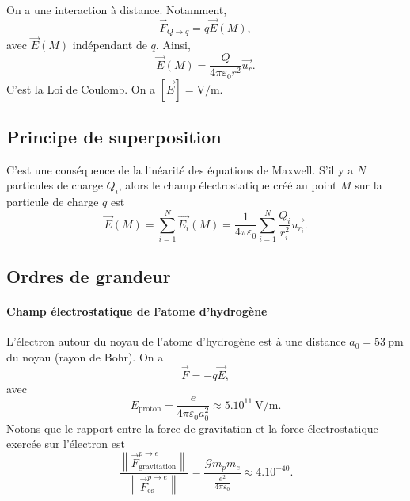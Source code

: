             On a une interaction à distance. Notamment,
            \begin{equation}
                \vec{F}_{Q\to q}=q\vec{E}(M),
            \end{equation}
            avec $\vec{E}(M)$ indépendant de $q$. Ainsi,
            \begin{equation}
                \boxed{
                    \vec{E}(M)=\frac{Q}{4\pi\varepsilon_{0}r^{2}}\vec{u_r}.
                }
            \end{equation}
            C'est la Loi de Coulomb. On a $[\vec{E}]=\si{\volt\per\metre}$.

    \subsection{Principe de superposition}

        C'est une conséquence de la linéarité des équations de Maxwell. S'il y a $N$ particules de charge $Q_i$, alors le champ électrostatique créé au point $M$ sur la particule de charge $q$ est 
        \begin{equation}
            \boxed{
                \vec{E}(M)=\sum_{i=1}^{N}\vec{E_i}(M)=\frac{1}{4\pi\varepsilon_{0}}\sum_{i=1}^{N}\frac{Q_i}{r_i^{2}}\vec{u_{r_i}}.
            }
        \end{equation}

    \subsection{Ordres de grandeur}

        \paragraph{Champ électrostatique de l'atome d'hydrogène}

            L'électron autour du noyau de l'atome d'hydrogène est à une distance $a_0=53~\si{\pico\metre}$ du noyau (rayon de Bohr). On a 
            \begin{equation}
                \vec{F}=-q\vec{E},
            \end{equation}
            avec
            \begin{equation}
                E_{\text{proton}}=\frac{e}{4\pi\varepsilon_{0}a_{0}^{2}}\approx5.10^{11}~\si{\volt\per\metre}.
            \end{equation}
            Notons que le rapport entre la force de gravitation et la force électrostatique exercée sur l'électron est 
            \begin{equation}
                \frac{\left\lVert\vec{F}_{\text{gravitation}}^{p\to e}\right\rVert}{\left\lVert\vec{F}_{\text{es}}^{p\to e}\right\rVert}=\frac{\mathcal{G}m_p m_e}{\frac{e^{2}}{4\pi\varepsilon_{0}}}\approx 4.10^{-40}.
            \end{equation}

